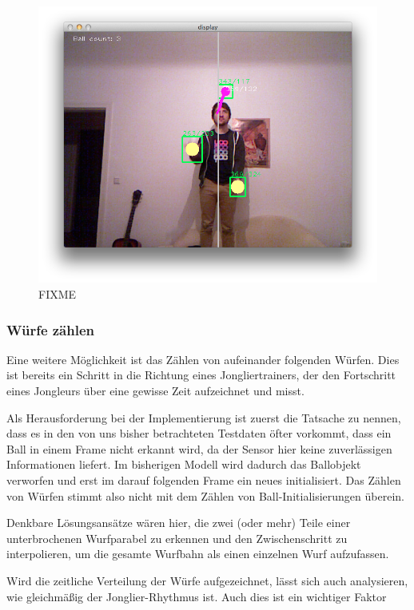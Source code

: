 \documentclass[12pt,a4paper,ngerman]{scrartcl}
\begin{document}
\begin{figure}[H]
    \centering
    \includegraphics[scale=0.5]{img/ballcount-2.png}
    \vspace{-0.5cm}
    \caption{FIXME}
    \label{ballcount-2}
\end{figure}


\subsubsection{Würfe zählen}

Eine weitere Möglichkeit ist das Zählen von aufeinander folgenden Würfen. Dies ist 
bereits ein Schritt in die Richtung eines Jongliertrainers, der den Fortschritt eines
Jongleurs über eine gewisse Zeit aufzeichnet und misst.

Als Herausforderung bei der Implementierung ist zuerst die Tatsache zu nennen, dass
es in den von uns bisher betrachteten Testdaten öfter vorkommt, dass ein Ball in 
einem Frame nicht erkannt wird, da der Sensor hier keine zuverlässigen Informationen
liefert. Im bisherigen Modell wird dadurch das Ballobjekt verworfen und erst im
darauf folgenden Frame ein neues initialisiert. Das Zählen von Würfen stimmt
also nicht mit dem Zählen von Ball-Initialisierungen überein.

Denkbare Lösungsansätze wären hier, die zwei (oder mehr) Teile einer unterbrochenen
Wurfparabel zu erkennen und den Zwischenschritt zu interpolieren, um die gesamte
Wurfbahn als einen einzelnen Wurf aufzufassen.

Wird die zeitliche Verteilung der Würfe aufgezeichnet, lässt sich auch analysieren,
wie gleichmäßig der Jonglier-Rhythmus ist. Auch dies ist ein wichtiger Faktor 
\end{document}
